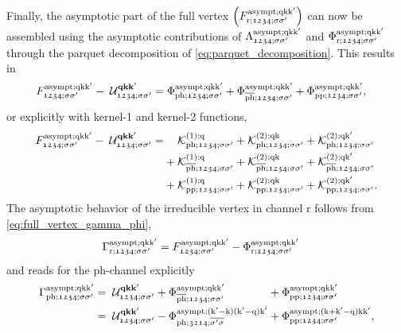 \documentclass[../../main.tex]{subfiles}
\begin{document}
Finally, the asymptotic part of the full vertex $\left (F_{\text{r};\mathfrak{1234};\sigma\sigma'}^{\text{asympt};\text{q}\text{k}\text{k}'}\right )$ can now be assembled using the asymptotic contributions of $\Lambda^{\text{asympt};\text{q}\text{k}\text{k}'}_{\mathfrak{1234};\sigma\sigma'}$ and $\Phi_{\text{r};\mathfrak{1234};\sigma\sigma'}^{\text{asympt};\text{q}\text{k}\text{k}'}$ through the parquet decomposition of \eqref{eq:parquet_decomposition}. This results in
\begin{align}
\begin{split}
	F_{\mathfrak{1234};\sigma\sigma'}^{\text{asympt};\text{q}\text{k}\text{k}'}-\;\mathcal{U}^{\textbf{qkk}'}_{\mathfrak{1234};\sigma\sigma'}&=\Phi_{\text{ph};\mathfrak{1234};\sigma\sigma'}^{\text{asympt};\text{q}\text{k}\text{k}'}+\Phi_{\overline{\text{ph}};\mathfrak{1234};\sigma\sigma'}^{\text{asympt};\text{q}\text{k}\text{k}'}+\Phi_{\text{pp};\mathfrak{1234};\sigma\sigma'}^{\text{asympt};\text{q}\text{k}\text{k}'},
\end{split}
\end{align}
or explicitly with kernel-1 and kernel-2 functions,
\begin{equation}
\begin{alignedat}{4}
	F_{\mathfrak{1234};\sigma\sigma'}^{\text{asympt};\text{q}\text{k}\text{k}'}-\;\mathcal{U}^{\textbf{qkk}'}_{\mathfrak{1234};\sigma\sigma'}=&\phantom{+}\;\,\mathcal{K}^{(1);\text{q}}_{\text{ph};\mathfrak{1234};\sigma\sigma'} &&+ \mathcal{K}^{(2);\text{q}\text{k}}_{\text{ph};\mathfrak{1234};\sigma\sigma'}&&+\mathcal{K}^{(2);\text{q}\text{k}'}_{\text{ph};\mathfrak{1234};\sigma\sigma'}\\
	&+\mathcal{K}^{(1);\text{q}}_{\overline{\text{ph}};\mathfrak{1234};\sigma\sigma'} &&+ \mathcal{K}^{(2);\text{q}\text{k}}_{\overline{\text{ph}};\mathfrak{1234};\sigma\sigma'}&&+\mathcal{K}^{(2);\text{q}\text{k}'}_{\overline{\text{ph}};\mathfrak{1234};\sigma\sigma'}\\
	&+\mathcal{K}^{(1);\text{q}}_{\text{pp};\mathfrak{1234};\sigma\sigma'} &&+ \mathcal{K}^{(2);\text{q}\text{k}}_{\text{pp};\mathfrak{1234};\sigma\sigma'}&&+\mathcal{K}^{(2);\text{q}\text{k}'}_{\text{pp};\mathfrak{1234};\sigma\sigma'}.
\end{alignedat}
\end{equation}
The asymptotic behavior of the irreducible vertex in channel r follows from \eqref{eq:full_vertex_gamma_phi},
\begin{align}
	\Gamma_{\text{r};\mathfrak{1234};\sigma\sigma'}^{\text{asympt};\text{q}\text{k}\text{k}'}&=F_{\mathfrak{1234};\sigma\sigma'}^{\text{asympt};\text{q}\text{k}\text{k}'}-\Phi_{\text{r};\mathfrak{1234};\sigma\sigma'}^{\text{asympt};\text{q}\text{k}\text{k}'}
\end{align}
and reads for the ph-channel explicitly
\begin{equation}
\begin{alignedat}{3}
	\Gamma_{\text{ph};\mathfrak{1234};\sigma\sigma'}^{\text{asympt};\text{q}\text{k}\text{k}'}&=\;\mathcal{U}^{\textbf{qkk}'}_{\mathfrak{1234};\sigma\sigma'}&&+\Phi_{\overline{\text{ph}};\mathfrak{1234};\sigma\sigma'}^{\text{asympt};\text{q}\text{k}\text{k}'}&&+\Phi_{\text{pp};\mathfrak{1234};\sigma\sigma'}^{\text{asympt};\text{q}\text{k}\text{k}'}\\
	&=\;\mathcal{U}^{\textbf{qkk}'}_{\mathfrak{1234};\sigma\sigma'}&&-\Phi_{\text{ph};\mathfrak{3214};\overline{\sigma'\sigma}}^{\text{asympt};(\text{k}'-\text{k})(\text{k}'-\text{q})\text{k}'}&&+\Phi_{\text{pp};\mathfrak{1234};\sigma\sigma'}^{\text{asympt};(\text{k}+\text{k}'-\text{q})\text{k}\text{k}'},
\end{alignedat}
\end{equation}
\end{document}
